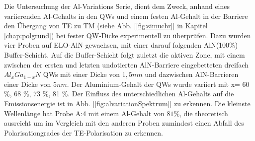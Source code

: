 Die Untersuchung der Al-Variations Serie, dient dem Zweck, anhand eines variierenden Al-Gehalts in den QWs und einem festen Al-Gehalt in der Barriere den \"Ubergang von TE zu TM (siehe Abb. [\ref{fig:simuchr}] in Kapitel \ref{chap:polgrund}) bei fester QW-Dicke experimentell zu \"uberpr\"ufen. Dazu wurden vier Proben auf ELO-AlN gewachsen, mit einer darauf folgenden AlN(100\%) Buffer-Schicht. Auf die Buffer-Schicht folgt zuletzt die aktiven Zone, mit einem zwischen der ersten und letzten undotierten AlN-Barriere eingebetteten dreifach $Al_{x}Ga_{1-x}N$ QWs mit einer Dicke von $1,5nm$ und dazwischen AlN-Barrieren einer Dicke von $5nm$. Der Aluminium-Gehalt der QWs wurde variiert mit x= 60 \%, 68 \%, 73 \%, 81 \%. 
Der Einfluss des unterschiedlichen Al-Gehalts auf die Emissionsenergie ist in Abb. [\ref{fig:alvariationSpektrum}] zu erkennen. Die kleinste Wellenl\"ange hat Probe A:4 mit einem Al-Gehalt von $81\%$, die theoretisch ausreicht um im Vergleich mit den anderen Proben zumindest einen Abfall des Polarisationgrades der TE-Polarisation zu erkennen.
%

